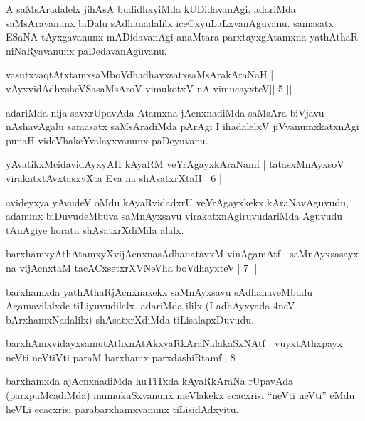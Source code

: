 \begin{artha}
A saMsAradalelx jihAsA budidhxyiMda kUDidavanAgi, adariMda
saMsAravanunx biDalu sAdhanadalilx iceCxyuLaLxvanAguvanu.
samasatx ESaNA tAyxgavanunx mADidavanAgi anaMtara parxtayxgAtamxna
yathAthaR niNaRyavanunx paDedavanAguvanu. 
\end{artha}

\begin{shl}
vasutxvaqtAtxtamxsaMboVdhadhavxsatxsaMsArakAraNaH |
vAyxvidAdhxsheVSasaMsAroV vimukotxV nA vimucayxteV\hfill || 5 ||
\end{shl}

\begin{artha}
adariMda nija savxrUpavAda Atamxna jAcnxnadiMda saMsAra biVjavu
nAshavAgalu samasatx saMsAradiMda pArAgi I ihadalelxV jiVvanumxkatxnAgi
punaH videVhakeYvalayxvanunx paDeyuvanu. 
\end{artha}

\begin{shl}
yAvatikxMcidavidAyxyAH kAyaRM veYrAgayxkAraNamf |
tatasxMnAyxsoV virakatxtAvxtasxvXta Eva na shAsatxrXtaH\hfill || 6 ||
\end{shl}

\begin{artha}
avideyxya yAvudeV oMdu kAyaRvidadxrU veYrAgayxkekx kAraNavAguvudu, adanunx biDuvudeMbuva saMnAyxsavu virakatxnAgiruvudariMda Aguvudu tAnAgiye horatu shAsatxrXdiMda alalx.
\end{artha}

\begin{shl}
barxhamxyAthAtamxyXvijAcnxnasAdhanatavxM vinA\s\s gamAtf |
saMnAyxsasayx na vijAcnxtaM tacACxsetxrXVNeVha boVdhayxteV\hfill || 7 ||
\end{shl}

\begin{artha}
barxhamxda yathAthaRjAcnxnakekx saMnAyxsavu sAdhanaveMbudu Agamavilalxde tiLiyuvudilalx. adariMda ililx (I adhAyxyada 4neV bArxhamxNadalilx) shAsatxrXdiMda tiLisalapxDuvudu.
\end{artha}


\begin{shl}
barxhAmxvidayxsamutAthxnAtAkxyaRkAraNalakaSxNAtf |
vuyxtAthxpayx neVti neVtiVti paraM barxhamx parxdashiRtamf\hfill || 8 ||
\end{shl}

\begin{artha}
barxhamxda ajAcnxnadiMda huTiTxda kAyaRkAraNa rUpavAda (parxpaMcadiMda) mumukuSxvanunx meVlakekx ecacxrisi ``neVti neVti'' eMdu heVLi ecacxrisi parabarxhamxvanunx tiLisidAdxyitu.
\end{artha}

